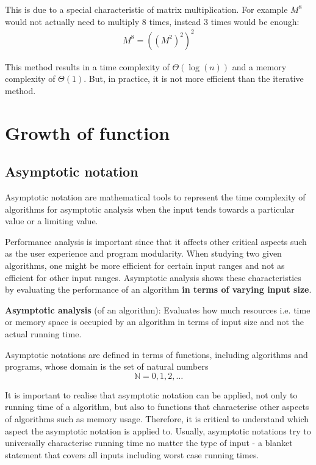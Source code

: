\documentclass[10pt,a4paper]{article}
\begin{document}
This is due to a special characteristic of matrix multiplication. For example
$M^8$ would not actually need to multiply $8$ times, instead $3$ times would be
enough:
\begin{align*}
    M^8 = ((M^2)^2)^2
\end{align*}

This method results in a time complexity of $\Theta(\log(n))$ and a memory complexity
of $\Theta(1)$. But, in practice, it is not more eﬃcient than the iterative method.


\pagebreak

\section{Growth of function}%
\subsection{Asymptotic notation}

Asymptotic notation are mathematical tools to represent the time complexity
of algorithms for asymptotic analysis when the input tends towards a particular
value or a limiting value.

Performance analysis is important since that it aﬀects other critical aspects
such as the user experience and program modularity. When studying two given
algorithms, one might be more eﬃcient for certain input ranges and not as
eﬃcient for other input ranges. Asymptotic analysis shows these characteristics
by evaluating the performance of an algorithm \textbf{in terms of varying input size}.

\begin{tcolorbox}[breakable,colback=white]
    \textbf{Asymptotic analysis} (of an algorithm): Evaluates how much resources
    i.e. time or memory space is occupied by an algorithm in terms of input
    size and not the actual running time.
\end{tcolorbox}

Asymptotic notations are deﬁned in terms of functions, including algorithms
and programs, whose domain is the set of natural numbers $$\mathbb{N} = {0,1,2,\dots}$$

It is important to realise that asymptotic notation can be applied, not only to
running time of a algorithm, but also to functions that characterise other aspects
of algorithms such as memory usage. Therefore, it is critical to understand which
aspect the asymptotic notation is applied to. Usually, asymptotic notations try
to universally characterise running time no matter the type of input - a blanket
statement that covers all inputs including worst case running times.
\end{document}
